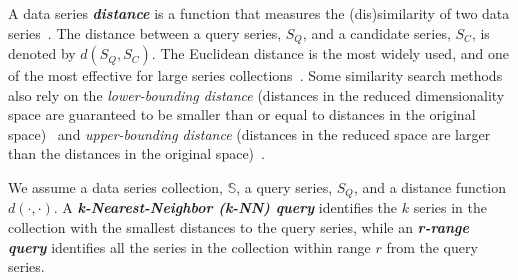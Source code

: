 A data series \textit{\textbf{distance}} is a function that measures the (dis)similarity of two data series~\cite{berndt1994using,das1997finding,DBLP:conf/edbt/AssfalgKKKPR06,DBLP:conf/icde/ChenNOT07,journal/dmkd/Wang2013,DBLP:conf/ssdbm/MirylenkaDP17}.
The distance between a query series, $S_Q$, and a candidate series, $S_C$, is denoted by $d(S_Q,S_C)$.
The Euclidean distance is the most widely used, and one of the most effective for large series collections~\cite{conf/vldb/Ding2008}.
Some similarity search methods also rely on the \textit{lower-bounding distance} (distances in the reduced dimensionality space are guaranteed to be smaller than or equal to distances in the original space)~\cite{journal/kais/Camerra2014,journal/vldb/Zoumpatianos2016,journal/edbt/Schafer2012,conf/vldb/Wang2013,dpisax,ulisse,conf/vldb/Ciaccia1997,conf/kdd/Karras2011} and \textit{upper-bounding distance} (distances in the reduced space are larger than the distances in the original space)~\cite{conf/vldb/Wang2013,conf/kdd/Karras2011}. 

We assume a data series collection, $\mathbb{S}$, a query series, $S_Q$, and a distance function $d(\cdot,\cdot)$.
%
A \textit{\textbf{k-Nearest-Neighbor (k-NN) query}} identifies the $k$ series in the collection with the smallest distances to the query series, while an \textit{\textbf{r-range query}} identifies all the series in the collection within range $r$ {\color{black}from} the query series.

